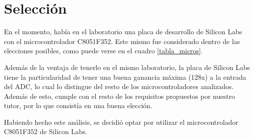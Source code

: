 \section{Selección} %
\label{sub:seleccion}

En el momento, hab\'ia en el laboratorio una placa de desarrollo de Silicon Labs con el microcontrolador C8051F352. Este mismo fue considerado dentro de las elecciones posibles, como puede verse en el cuadro \ref{tabla_micros}.

Además de la ventaja de tenerlo en el mismo laboratorio, la placa de Silicon Labs tiene la particularidad de tener una buena ganancia máxima (128x) a la entrada del ADC, lo cual lo distingue del resto de los microcontroladores analizados. Además de esto, cumple con el resto de los requisitos propuestos por nuestro tutor, por lo que consist\'ia en una buena elección.

Habiendo hecho este análisis, se decidió optar por utilizar el microcontrolador C8051F352 de Silicon Labs.




\clearpage
